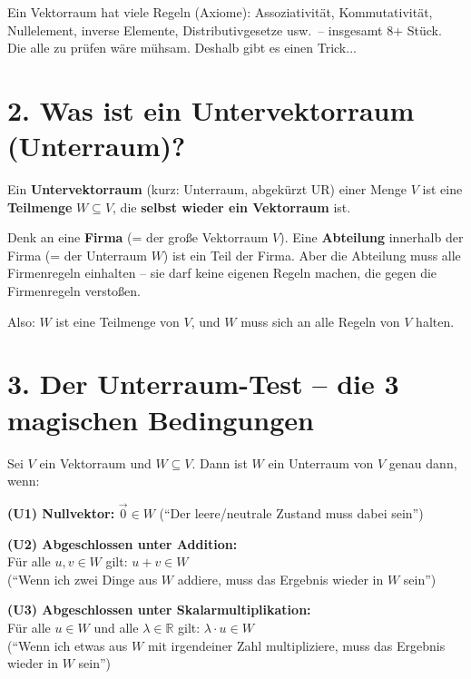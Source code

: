 \documentclass[a4paper,12pt]{article}
\begin{document}
Ein Vektorraum hat viele Regeln (Axiome): Assoziativit\"at, Kommutativit\"at, Nullelement, inverse Elemente, Distributivgesetze usw.\ -- insgesamt 8+ St\"uck. Die alle zu pr\"ufen w\"are m\"uhsam. Deshalb gibt es einen Trick...

\section*{2. Was ist ein Untervektorraum (Unterraum)?}

Ein \textbf{Untervektorraum} (kurz: Unterraum, abgek\"urzt UR) einer Menge $V$ ist eine \textbf{Teilmenge} $W \subseteq V$, die \textbf{selbst wieder ein Vektorraum} ist.

\begin{analogie}
Denk an eine \textbf{Firma} (= der gro\ss e Vektorraum $V$). Eine \textbf{Abteilung} innerhalb der Firma (= der Unterraum $W$) ist ein Teil der Firma. Aber die Abteilung muss alle Firmenregeln einhalten -- sie darf keine eigenen Regeln machen, die gegen die Firmenregeln versto\ss en.

Also: $W$ ist eine Teilmenge von $V$, und $W$ muss sich an alle Regeln von $V$ halten.
\end{analogie}

\section*{3. Der Unterraum-Test -- die 3 magischen Bedingungen}

\begin{merkbox}[title={Der Unterraum-Test (URT)}]
Sei $V$ ein Vektorraum und $W \subseteq V$. Dann ist $W$ ein Unterraum von $V$ genau dann, wenn:

\medskip
\textbf{(U1) Nullvektor:} $\vec{0} \in W$ \quad (``Der leere/neutrale Zustand muss dabei sein'')

\medskip
\textbf{(U2) Abgeschlossen unter Addition:}\\
F\"ur alle $u, v \in W$ gilt: $u + v \in W$\\
(``Wenn ich zwei Dinge aus $W$ addiere, muss das Ergebnis wieder in $W$ sein'')

\medskip
\textbf{(U3) Abgeschlossen unter Skalarmultiplikation:}\\
F\"ur alle $u \in W$ und alle $\lambda \in \mathbb{R}$ gilt: $\lambda \cdot u \in W$\\
(``Wenn ich etwas aus $W$ mit irgendeiner Zahl multipliziere, muss das Ergebnis wieder in $W$ sein'')
\end{merkbox}
\end{document}

